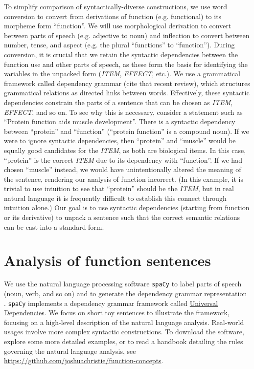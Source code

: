 \documentclass{article}
\begin{document}
To simplify comparison of syntactically-diverse constructions, we use word conversion to convert from derivations of function (e.g. functional) to its morpheme form ``function''.
We will use morphological derivation to convert between parts of speech (e.g. adjective to noun) and inflection to convert between number, tense, and aspect (e.g. the plural ``functions'' to ``function'').
During conversion, it is crucial that we retain the syntactic dependencies between the function use and other parts of speech, as these form the basis for identifying the variables in the unpacked form (\emph{ITEM}, \emph{EFFECT}, etc.).
We use a grammatical framework called dependency grammar (cite that recent review), which structures grammatical relations as directed links between words.
Effectively, these syntactic dependencies constrain the parts of a sentence that can be chosen as \emph{ITEM}, \emph{EFFECT}, and so on.
To see why this is necessary, consider a statement such as ``Protein function aids muscle development''.
There is a syntactic dependency between ``protein'' and ``function'' (``protein function'' is a compound noun).
If we were to ignore syntactic dependencies, then ``protein'' and ``muscle'' would be equally good candidates for the \emph{ITEM}, as both are biological items.
In this case, ``protein'' is the correct \emph{ITEM} due to its dependency with ``function''.
If we had chosen ``muscle'' instead, we would have unintentionally altered the meaning of the sentence, rendering our analysis of function incorrect.
(In this example, it is trivial to use intuition to see that ``protein'' should be the \emph{ITEM}, but in real natural language it is frequently difficult to establish this connect through intuition alone.)
Our goal is to use syntactic dependencies (starting from function or its derivative) to unpack a sentence such that the correct semantic relations can be cast into a standard form.

\section{Analysis of function sentences}
\label{sec:example-sentences}

We use the natural language processing software \texttt{spaCy} to label parts of speech (noun, verb, and so on) and to generate the dependency grammar representation \cite{spacy}.
\texttt{spaCy} implements a dependency grammar framework called \href{https://universaldependencies.org/#language-en}{Universal Dependencies}.
We focus on short toy sentences to illustrate the framework, focusing on a high-level description of the natural language analysis.
Real-world usages involve more complex syntactic constructions.
To download the software, explore some more detailed examples, or to read a handbook detailing the rules governing the natural language analysis, see
\newline
\href{https://github.com/joshuachristie/function-concepts}{https://github.com/joshuachristie/function-concepts}.
\end{document}

